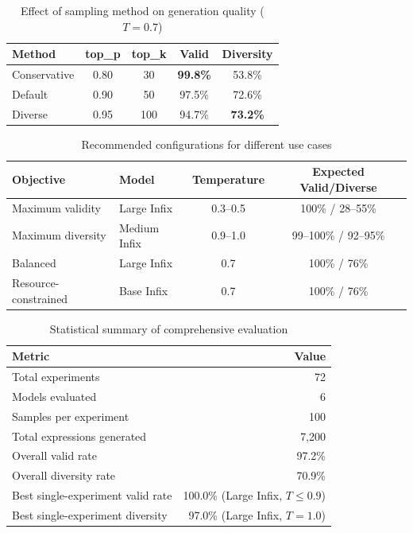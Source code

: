\begin{table}[htbp]
\centering
\caption{Effect of sampling method on generation quality ($T=0.7$)}
\label{tab:sampling_methods}
\begin{tabular}{@{}lcccc@{}}
\toprule
\textbf{Method} & \textbf{top\_p} & \textbf{top\_k} & \textbf{Valid} & \textbf{Diversity} \\
\midrule
Conservative & 0.80 & 30 & \textbf{99.8\%} & 53.8\% \\
Default & 0.90 & 50 & 97.5\% & 72.6\% \\
Diverse & 0.95 & 100 & 94.7\% & \textbf{73.2\%} \\
\bottomrule
\end{tabular}
\end{table}

\begin{table}[htbp]
\centering
\caption{Recommended configurations for different use cases}
\label{tab:recommendations}
\begin{tabular}{@{}llcc@{}}
\toprule
\textbf{Objective} & \textbf{Model} & \textbf{Temperature} & \textbf{Expected Valid/Diverse} \\
\midrule
Maximum validity & Large Infix & 0.3--0.5 & 100\% / 28--55\% \\
Maximum diversity & Medium Infix & 0.9--1.0 & 99--100\% / 92--95\% \\
Balanced & Large Infix & 0.7 & 100\% / 76\% \\
Resource-constrained & Base Infix & 0.7 & 100\% / 76\% \\
\bottomrule
\end{tabular}
\end{table}

\begin{table}[htbp]
\centering
\caption{Statistical summary of comprehensive evaluation}
\label{tab:stats_summary}
\begin{tabular}{@{}lr@{}}
\toprule
\textbf{Metric} & \textbf{Value} \\
\midrule
Total experiments & 72 \\
Models evaluated & 6 \\
Samples per experiment & 100 \\
Total expressions generated & 7,200 \\
Overall valid rate & 97.2\% \\
Overall diversity rate & 70.9\% \\
Best single-experiment valid rate & 100.0\% (Large Infix, $T \leq 0.9$) \\
Best single-experiment diversity & 97.0\% (Large Infix, $T=1.0$) \\
\bottomrule
\end{tabular}
\end{table}
